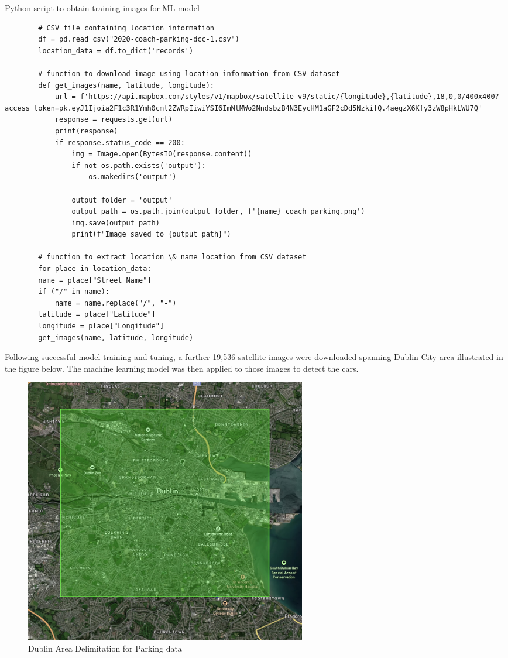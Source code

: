 \begin{listing}[h!]
    \centering
    \caption{Python script to obtain training images for ML model}
    \begin{verbatim}
        # CSV file containing location information
        df = pd.read_csv("2020-coach-parking-dcc-1.csv")
        location_data = df.to_dict('records')

        # function to download image using location information from CSV dataset
        def get_images(name, latitude, longitude):
            url = f'https://api.mapbox.com/styles/v1/mapbox/satellite-v9/static/{longitude},{latitude},18,0,0/400x400?access_token=pk.eyJ1Ijoia2F1c3R1Ymh0cml2ZWRpIiwiYSI6ImNtMWo2NndsbzB4N3EycHM1aGF2cDd5NzkifQ.4aegzX6Kfy3zW8pHkLWU7Q'
            response = requests.get(url)
            print(response)
            if response.status_code == 200:
                img = Image.open(BytesIO(response.content))
                if not os.path.exists('output'):
                    os.makedirs('output')

                output_folder = 'output'
                output_path = os.path.join(output_folder, f'{name}_coach_parking.png')
                img.save(output_path)
                print(f"Image saved to {output_path}")

        # function to extract location \& name location from CSV dataset
        for place in location_data:
        name = place["Street Name"]
        if ("/" in name):
            name = name.replace("/", "-")
        latitude = place["Latitude"]
        longitude = place["Longitude"]
        get_images(name, latitude, longitude)
    \end{verbatim}
\end{listing}
Following successful model training and tuning, a further 19,536 satellite images were downloaded spanning Dublin City area illustrated in the figure below. The machine learning model was then applied to those images to detect the cars.
\begin{figure}[h!]
    \centering
    \includegraphics[width=0.6\textwidth]{images/dublin-img-area.jpg}
    \caption{Dublin Area Delimitation for Parking data}
\end{figure}\\


